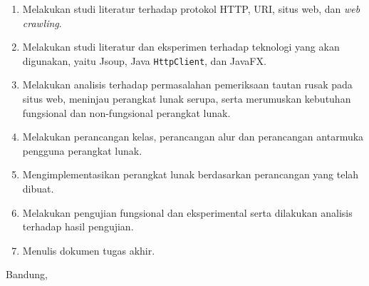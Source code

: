 \documentclass[a4paper,twoside]{article}
\begin{document}
\begin{enumerate}
    
    \item Melakukan studi literatur terhadap protokol HTTP, URI, situs web, dan \textit{web crawling}.
    
    \item Melakukan studi literatur dan eksperimen terhadap teknologi yang akan digunakan, yaitu Jsoup, Java \texttt{HttpClient}, dan JavaFX.
    
    \item Melakukan analisis terhadap permasalahan pemeriksaan tautan rusak pada situs web, meninjau perangkat lunak serupa, serta merumuskan kebutuhan fungsional dan non-fungsional perangkat lunak.
    
    \item Melakukan perancangan kelas, perancangan alur dan perancangan antarmuka pengguna perangkat lunak.
    
    \item Mengimplementasikan perangkat lunak berdasarkan perancangan yang telah dibuat.
    
    \item Melakukan pengujian fungsional dan eksperimental serta dilakukan analisis terhadap hasil pengujian.
    
    \item Menulis dokumen tugas akhir.
\end{enumerate}

\vspace{1cm}
\centering Bandung, \tanggal\\
\vspace{2cm} \nama \\ 
\vspace{1cm}
\end{document}
